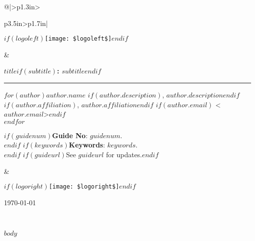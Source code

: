 \documentclass[$if(fontsize)$$fontsize$$endif$,english,letterpaper]{scrartcl}
\providecommand{\tabularnewline}{\\}
\begin{document}
\setlength{\tabcolsep}{1pt}
\begin{tabular}{@{}|>{\centering}p{1.3in}>{\raggedright}p{3.5in}>{\raggedleft}p{1.7in}|}
\hline 
\begin{minipage}[c]{1in}%
  \begin{center}
    $if(logoleft)$\texttt{[image: \$logoleft\$]}$endif$
    \par
  \end{center}%
\end{minipage} & %
\begin{minipage}[c]{3.5in}%
  \begin{center}
     \begin{minipage}[t]{1\columnwidth}%
      \begin{center}
        \bigskip
        \textbf{\larger{}$title$$if(subtitle)$: $subtitle$$endif$}
      \end{center}
      \vspace{-15pt}
      \rule[0ex]{1\linewidth}{1pt}%
    \end{minipage}
    \par\end{center}{\Huge \par}
\begin{minipage}[t]{1\columnwidth}%
\begin{center}
  $for(author)$\textbf{$author.name$}%
  $if(author.description)$, $author.description$$endif$%
  $if(author.affiliation)$, $author.affiliation$$endif$%
  $if(author.email)$ <$author.email$>$endif$\\
  \smallskip
$endfor$
\par\end{center}%
\end{minipage}
\begin{flushleft}
  $if(guidenum)$\textbf{Guide No}: $guidenum$.\\$endif$
  $if(keywords)$\textbf{Keywords}: $keywords$.\\$endif$
  $if(guideurl)$See $guideurl$ for updates.$endif$
  \par\end{flushleft}%
\smallskip
\end{minipage} & %
\begin{minipage}[c]{2in}%
\begin{center}
$if(logoright)$\texttt{[image: \$logoright\$]}$endif$
\par\end{center}
\end{minipage}

\begin{minipage}[c]{1.7in}%
  \begin{center}
    \medskip
    \today\par
  \end{center}%
\end{minipage}\tabularnewline
\hline 
\end{tabular}

\medskip{}


$body$
\end{document}
